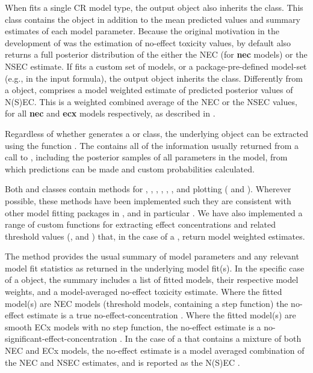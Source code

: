 \documentclass[
  shortnames]{jss}
\begin{document}
When  fits a single CR model type, the output object also inherits the  class. This class contains the  object in addition to the mean predicted values and summary estimates of each model parameter. Because the original motivation in the development of  was the estimation of no-effect toxicity values, by default  also returns a full posterior distribution of the either the NEC (for \textbf{nec} models) or the NSEC \citep[for \textbf{ecx} models, see][]{Fisher2023} estimate. If  fits a custom set of models, or a package-pre-defined model-set (e.g.,  in the input formula), the output object inherits the  class. Differently from a  object,  comprises a model weighted estimate of predicted posterior values of N(S)EC. This is a weighted combined average of the NEC or the NSEC values, for all \textbf{nec} and \textbf{ecx} models respectively, as described in \citet{fisher2023ieam}.

Regardless of whether  generates a  or  class, the underlying  object can be extracted using the function . The  contains all of the information usually returned from a call to , including the posterior samples of all parameters in the model, from which predictions can be made and custom probabilities calculated.

Both  and  classes contain methods for , , , , , ,  and plotting ( and \newline {}). Wherever possible, these methods have been implemented such they are consistent with other model fitting packages in , and in particular . We have also implemented a range of custom functions for extracting effect concentrations and related threshold values (,  and ) that, in the case of a , return model weighted estimates.

The  method provides the usual summary of model parameters and any relevant model fit statistics as returned in the underlying  model fit(s). In the specific case of a  object, the summary includes a list of fitted models, their respective model weights, and a model-averaged no-effect toxicity estimate. Where the fitted model(s) are NEC models (threshold models, containing a step function) the no-effect estimate is a true no-effect-concentration \citep[NEC, see][]{Fox2010}. Where the fitted model(s) are smooth ECx models with no step function, the no-effect estimate is a no-significant-effect-concentration \citep[NSEC, see][]{Fisher2023}. In the case of a  that contains a mixture of both NEC and ECx models, the no-effect estimate is a model averaged combination of the NEC and NSEC estimates, and is reported as the N(S)EC \citep[see][]{fisher2023ieam}.
\end{document}
